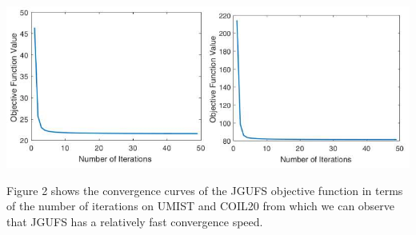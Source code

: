 \documentclass[a0paper,portrait]{baposter}
\begin{document}
\begin{poster}
{%
\vspace{-15pt}
\begin{center}
\includegraphics[width=0.8\linewidth]{result_cur.jpg}
\vspace{-8pt}
\end{center}

\vspace{-8pt}
 Figure 2 shows the convergence curves of the JGUFS objective function in terms of the number of iterations on UMIST and COIL20 from which we can observe that JGUFS has a relatively fast convergence speed. 


}

\end{poster}
\end{document}
